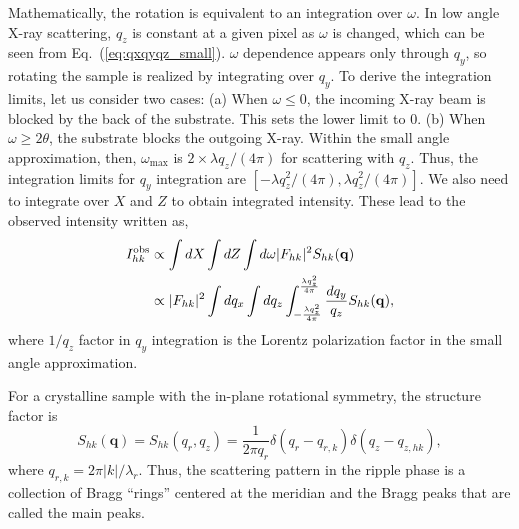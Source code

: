 Mathematically, the rotation is  
equivalent to an integration over $\omega$. In low angle X-ray scattering, 
$q_z$ is constant at a given pixel as $\omega$ is changed, which can be seen from 
Eq.~(\ref{eq:qxqyqz_small}). $\omega$ dependence appears only through $q_y$, 
so rotating the sample is realized by integrating over $q_y$. 
To derive the integration limits, let us consider two cases: (a) When $\omega \leq 0$,
the incoming X-ray beam is blocked by the back of the substrate. This sets 
the lower limit to 0. (b) When $\omega \geq 2\theta$, the substrate blocks 
the outgoing X-ray. Within the small angle approximation, then, $\omega_{\text{max}}$
is $2\times \lambda q_z/(4\pi)$ for scattering with $q_z$. 
Thus, the integration limits 
for $q_y$ integration are $[-\lambda q_z^2/(4\pi), \lambda q_z^2/(4\pi)]$.
We also need to integrate over $X$ and $Z$ to obtain integrated intensity. 
These lead to the observed intensity
written as,
\begin{align}
  I_{hk}^\mathrm{obs} 
    &\propto \int dX \int dZ \int d\omega |F_{hk}|^2 S_{hk}(\mathbf{q}) \nonumber \\
    &\propto |F_{hk}|^2 \int dq_x \int dq_z 
             \int_{-\frac{\lambda q_z^2}{4\pi}}^{\frac{\lambda q_z^2}{4\pi}} 
             \frac{dq_y}{q_z} 
             S_{hk}(\mathbf{q}),
\end{align}
where $1/q_z$ factor in $q_y$ integration is the Lorentz polarization factor
in the small angle approximation. 

For a crystalline sample with the in-plane rotational symmetry, the
structure factor is  
\begin{equation}
  S_{hk}(\mathbf{q}) = S_{hk}(q_r,q_z) 
  = \frac{1}{2\pi q_r}\delta(q_r-q_{r,k})\delta(q_z-q_{z,hk}),
\end{equation} 
where $q_{r,k}=2\pi |k|/\lambda_r$. Thus, the scattering pattern in the 
ripple phase is a 
collection of Bragg ``rings'' centered at the meridian and the 
Bragg peaks that are called the main peaks.  

